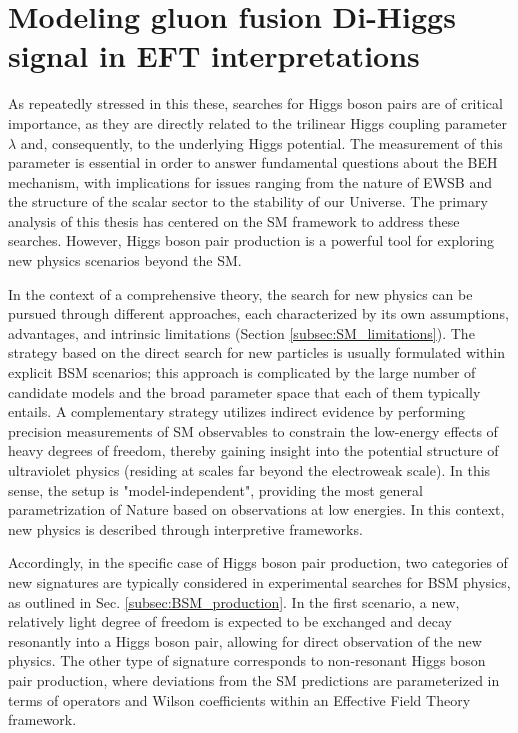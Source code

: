 \chapter{Modeling gluon fusion Di-Higgs signal in EFT interpretations}
\label{ch:eft_modeling}
As repeatedly stressed in this these, searches for Higgs boson pairs are of critical importance, as they are directly related to the trilinear Higgs coupling parameter $\lambda$ and, consequently, to the underlying Higgs potential. The measurement of this parameter is essential in order to answer fundamental questions about the BEH mechanism, with implications for issues ranging from the nature of EWSB and the structure of the scalar sector to the stability of our Universe. The primary analysis of this thesis has centered on the SM framework to address these searches. However, Higgs boson pair production is a powerful tool for exploring new physics scenarios beyond the SM.

In the context of a comprehensive theory, the search for new physics can be pursued through different approaches, each characterized by its own assumptions, advantages, and intrinsic limitations (Section \ref{subsec:SM_limitations}). The strategy based on the direct search for new particles is usually formulated within explicit BSM scenarios; this approach is complicated by the large number of candidate models and the broad parameter space that each of them typically entails. A complementary strategy utilizes indirect evidence by performing precision measurements of SM observables to constrain the low-energy effects of heavy degrees of freedom, thereby gaining insight into the potential structure of ultraviolet physics (residing at scales far beyond the electroweak scale). In this sense, the setup is "model-independent", providing the most general parametrization of Nature based on observations at low energies. In this context, new physics is described through interpretive frameworks.

Accordingly, in the specific case of Higgs boson pair production, two categories of new signatures are typically considered in experimental searches for BSM physics, as outlined in Sec. \ref{subsec:BSM_production}. In the first scenario, a new, relatively light degree of freedom is expected to be exchanged and decay resonantly into a Higgs boson pair, allowing for direct observation of the new physics. The other type of signature corresponds to non-resonant Higgs boson pair production, where deviations from the SM predictions are parameterized in terms of operators and Wilson coefficients within an Effective Field Theory framework.

